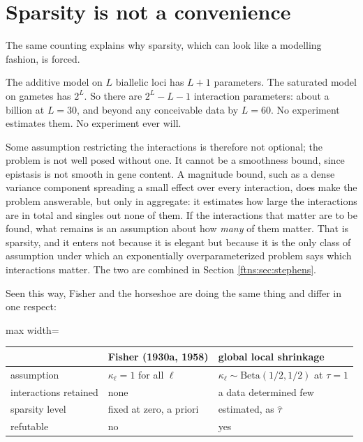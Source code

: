 \section{Sparsity is not a convenience}
\label{ftns:sec:sparsity}

The same counting explains why sparsity, which can look like a modelling fashion, is forced.

The additive model on $L$ biallelic loci has $L+1$ parameters. The saturated model on gametes has
$2^L$. So there are $2^L-L-1$ interaction parameters: about a billion at $L=30$, and beyond any
conceivable data by $L=60$. No experiment estimates them. No experiment ever will.

Some assumption restricting the interactions is therefore not optional; the problem is not well
posed without one. It cannot be a smoothness bound, since epistasis is not smooth in gene content. A magnitude bound, such as a dense variance component spreading a small effect over every interaction, does make the problem answerable, but only in aggregate: it estimates how large the interactions are in total and singles out none of them. If the interactions that matter are to be found, what remains is an assumption about how \emph{many} of them matter. That is sparsity, and it enters not because it is elegant but because it is the only class of assumption under which an exponentially overparameterized problem says which interactions matter. The two are combined in Section \ref{ftns:sec:stephens}.

Seen this way, Fisher and the horseshoe are doing the same thing and differ in one respect:

\begin{center}
\begin{adjustbox}{max width=\textwidth}
\begin{tabular}{lll}
\toprule
& Fisher (1930a, 1958) & global local shrinkage \\
\midrule
assumption & $\kappa_\ell=1$ for all $\ell$ & $\kappa_\ell\sim\text{Beta}(1/2,1/2)$ at $\tau=1$ \\
interactions retained & none & a data determined few \\
sparsity level & fixed at zero, a priori & estimated, as $\hat\tau$ \\
refutable & no & yes \\
\bottomrule
\end{tabular}
\end{adjustbox}
\end{center}

